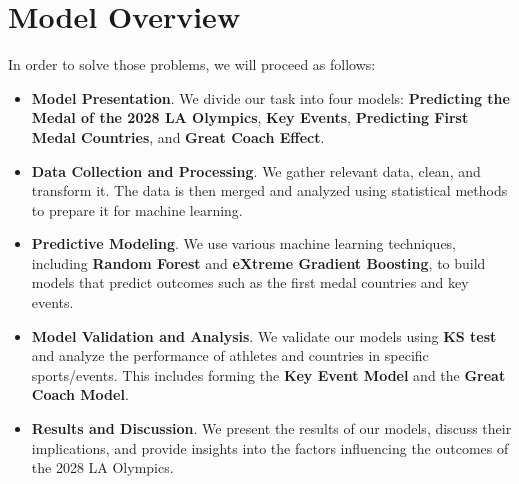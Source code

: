 \section*{Model Overview}


In order to solve those problems, we will proceed as follows:

\begin{itemize}
    \begin{figure}[htbp]
        \centering
        \texttt{[image: ./figures/figure1\_work\_flow.png]}
        \caption{Flow chart}
        \label{fig:flow_chart}
    \end{figure}
    
\item {\bf Model Presentation}. We divide our task into four models: \textbf{Predicting the Medal of the 2028 LA Olympics}, \textbf{Key Events}, \textbf{Predicting First Medal Countries}, and \textbf{Great Coach Effect}.

\item {\bf Data Collection and Processing}. We gather relevant data, clean, and transform it. The data is then merged and analyzed using statistical methods to prepare it for machine learning.

\item {\bf Predictive Modeling}. We use various machine learning techniques, including \textbf{Random Forest} and \textbf{eXtreme Gradient Boosting}, to build models that predict outcomes such as the first medal countries and key events.

\item {\bf Model Validation and Analysis}. We validate our models using \textbf{KS test} and analyze the performance of athletes and countries in specific sports/events. This includes forming the \textbf{Key Event Model} and the \textbf{Great Coach Model}.

\item {\bf Results and Discussion}. We present the results of our models, discuss their implications, and provide insights into the factors influencing the outcomes of the 2028 LA Olympics.
\end{itemize}
